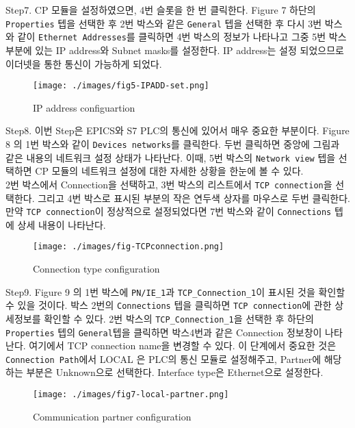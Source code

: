 \documentclass[11pt
  , a4paper
  , article
  , oneside
]{memoir}
\begin{document}
\newline Step7. CP 모듈을 설정하였으면, 4번 슬롯을 한 번 클릭한다. Figure 7 하단의 \verb|Properties| 텝을 선택한 후 2번 박스와 같은 \verb|General| 텝을 선택한 후 다시 3번 박스와 같이 \verb|Ethernet Addresses|를 클릭하면 4번 박스의 정보가 나타나고 그중 5번 박스 부분에 있는 IP address와 Subnet masks를 설정한다. IP address는 설정 되었으므로 이더넷을 통한 통신이 가능하게 되었다.\\
\begin{figure}[!htb]
  \centering
  \texttt{[image: ./images/fig5-IPADD-set.png]}
  \caption{IP address configuartion}
  \label{}
\end{figure}
\newline Step8. 이번 Step은 EPICS와 S7 PLC의 통신에 있어서 매우 중요한 부분이다. Figure 8 의 1번 박스와 같이 \verb|Devices networks|를 클릭한다. 두번 클릭하면 중앙에 그림과 같은 내용의 네트워크 설정 상태가 나타난다. 이때, 5번 박스의 \verb|Network view| 텝을 선택하면 CP 모듈의 네트워크 설정에 대한 자세한 상황을 한눈에 볼 수 있다.\\ 
\newline 2번 박스에서 Connection을 선택하고, 3번 박스의 리스트에서 \verb|TCP connection|을 선택한다. 그리고 4번 박스로 표시된 부분의 작은 연두색 상자를 마우스로 두번 클릭한다. 만약 \verb|TCP connection|이 정상적으로 설정되었다면 7번 박스와 같이 \verb|Connections|  텝에 상세 내용이 나타난다. \\
\begin{figure}[!htb]
  \centering
  \texttt{[image: ./images/fig-TCPconnection.png]}
  \caption{Connection type configuration}
  \label{}
\end{figure}
\newline Step9. Figure 9 의 1번 박스에 \verb|PN/IE_1|과 \verb|TCP_Connection_1|이 표시된 것을 확인할 수 있을 것이다. 박스 2번의 \verb|Connections| 텝을 클릭하면 \verb|TCP connection|에 관한 상세정보를 확인할 수 있다. 2번 박스의 \verb|TCP_Connection_1|을 선택한 후 하단의 \verb|Properties| 텝의 \verb|General|텝을 클릭하면 박스4번과 같은 Connection 정보창이 나타난다. 여기에서 TCP connection name을 변경할 수 있다. 이 단계에서 중요한 것은 \verb|Connection Path|에서 LOCAL 은 PLC의 통신 모듈로 설정해주고, Partner에 해당하는 부분은 Unknown으로 선택한다. Interface type은 Ethernet으로 설정한다.\\
\begin{figure}[!htb]
  \centering
  \texttt{[image: ./images/fig7-local-partner.png]}
  \caption{Communication partner configuration}
  \label{}
\end{figure}
\end{document}
